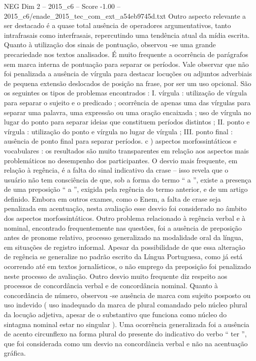 \begin{textsample}{NEG Dim 2 – 2015\_c6 – Score -1.00 – 2015\_c6/enade\_2015\_tec\_com\_ext\_a54eb9745d.txt}
Outro aspecto relevante a ser destacado é a quase total ausência de operadores argumentativos, tanto intrafrasais como interfrasais, repercutindo uma tendência atual da mídia escrita.
Quanto à utilização dos sinais de pontuação, observou -se uma grande precariedade nos textos analisados.
É muito frequente a ocorrência de parágrafos sem marca interna de pontuação para separar os períodos.
Vale observar que não foi penalizada a ausência de vírgula para destacar locuções ou adjuntos adverbiais de pequena extensão deslocados de posição na frase, por ser um uso opcional.
São os seguintes os tipos de problemas encontrados : I. vírgula : utilização de vírgula para separar o sujeito e o predicado ; ocorrência de apenas uma das vírgulas para separar uma palavra, uma expressão ou uma oração encaixada ; uso de vírgula no lugar do ponto para separar ideias que constituem períodos distintos ; II. ponto e vírgula : utilização do ponto e vírgula no lugar de vírgula ; III. ponto final : ausência de ponto final para separar períodos. c ) aspectos morfossintáticos e vocabulares : os resultados são muito transparentes em relação aos aspectos mais problemáticos no desempenho dos participantes.
O desvio mais frequente, em relação à regência, é a falta do sinal indicativo da crase – isso revela que o usuário não tem consciência de que, sob a forma do termo “ a ”, existe a presença de uma preposição “ a ”, exigida pela regência do termo anterior, e de um artigo definido.
Embora em outros exames, como o Enem, a falta de crase seja penalizada em acentuação, nesta avaliação esse desvio foi considerado no âmbito dos aspectos morfossintáticos.
Outro problema relacionado à regência verbal e à nominal, encontrado frequentemente nas questões, foi a ausência de preposição antes de pronome relativo, processo generalizado na modalidade oral da língua, em situações de registro informal.
Apesar da possibilidade de que essa alteração de regência se generalize no padrão escrito da Língua Portuguesa, como já está ocorrendo até em textos jornalísticos, o não emprego da preposição foi penalizado neste processo de avaliação.
Outro desvio muito frequente diz respeito aos processos de concordância verbal e de concordância nominal.
Quanto à concordância de número, observou -se ausência de marca com sujeito posposto ou uso indevido ( uso inadequado da marca de plural comandado pelo núcleo plural da locução adjetiva, apesar de o substantivo que funciona como núcleo do sintagma nominal estar no singular ).
Uma ocorrência generalizada foi a ausência de acento circunflexo na forma plural do presente do indicativo do verbo “ ter ”, que foi considerada como um desvio na concordância verbal e não na acentuação gráfica.

\end{textsample}

